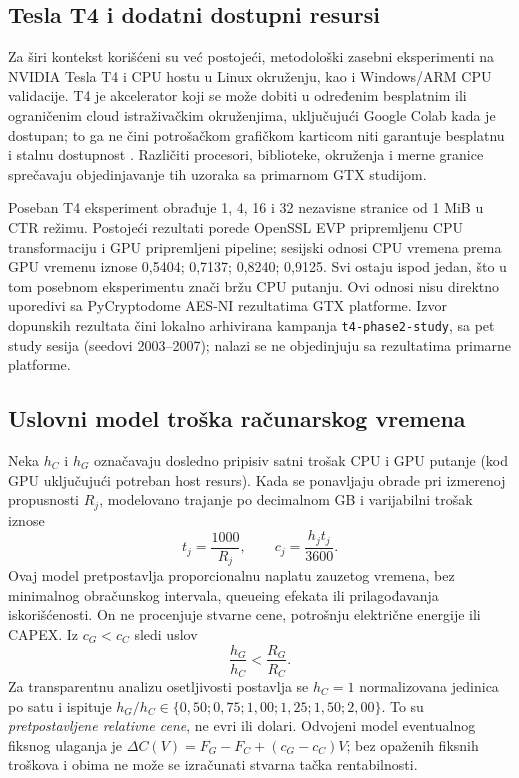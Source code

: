 \documentclass[11pt,b5paper]{article}
\begin{document}
\subsection{Tesla T4 i dodatni dostupni resursi}
Za širi kontekst korišćeni su već postojeći, metodološki zasebni eksperimenti na NVIDIA Tesla T4 i CPU hostu u Linux okruženju, kao i Windows/ARM CPU validacije. T4 je akcelerator koji se može dobiti u određenim besplatnim ili ograničenim cloud istraživačkim okruženjima, uključujući Google Colab kada je dostupan; to ga ne čini potrošačkom grafičkom karticom niti garantuje besplatnu i stalnu dostupnost \citep{colab}. Različiti procesori, biblioteke, okruženja i merne granice sprečavaju objedinjavanje tih uzoraka sa primarnom GTX studijom.\par
Poseban T4 eksperiment obrađuje 1, 4, 16 i 32 nezavisne stranice od 1 MiB u CTR režimu. Postojeći rezultati porede OpenSSL EVP pripremljenu CPU transformaciju i GPU pripremljeni pipeline; sesijski odnosi CPU vremena prema GPU vremenu iznose 0,5404; 0,7137; 0,8240; 0,9125. Svi ostaju ispod jedan, što u tom posebnom eksperimentu znači bržu CPU putanju. Ovi odnosi nisu direktno uporedivi sa PyCryptodome AES-NI rezultatima GTX platforme. Izvor dopunskih rezultata čini lokalno arhivirana kampanja \texttt{t4-phase2-study}, sa pet study sesija (seedovi 2003--2007); nalazi se ne objedinjuju sa rezultatima primarne platforme.

\subsection{Uslovni model troška računarskog vremena}
Neka $h_C$ i $h_G$ označavaju dosledno pripisiv satni trošak CPU i GPU putanje (kod GPU uključujući potreban host resurs). Kada se ponavljaju obrade pri izmerenoj propusnosti $R_j$, modelovano trajanje po decimalnom GB i varijabilni trošak iznose
\begin{equation}\label{eq:cost}t_j=\frac{1000}{R_j},\qquad c_j=\frac{h_jt_j}{3600}.\end{equation}
Ovaj model pretpostavlja proporcionalnu naplatu zauzetog vremena, bez minimalnog obračunskog intervala, queueing efekata ili prilagođavanja iskorišćenosti. On ne procenjuje stvarne cene, potrošnju električne energije ili CAPEX. Iz $c_G<c_C$ sledi uslov
\begin{equation}\label{eq:threshold}\frac{h_G}{h_C}<\frac{R_G}{R_C}.\end{equation}
Za transparentnu analizu osetljivosti postavlja se $h_C=1$ normalizovana jedinica po satu i ispituje $h_G/h_C\in\{0{,}50;0{,}75;1{,}00;1{,}25;1{,}50;2{,}00\}$. To su \emph{pretpostavljene relativne cene}, ne evri ili dolari. Odvojeni model eventualnog fiksnog ulaganja je $\Delta C(V)=F_G-F_C+(c_G-c_C)V$; bez opaženih fiksnih troškova i obima ne može se izračunati stvarna tačka rentabilnosti.
\end{document}
